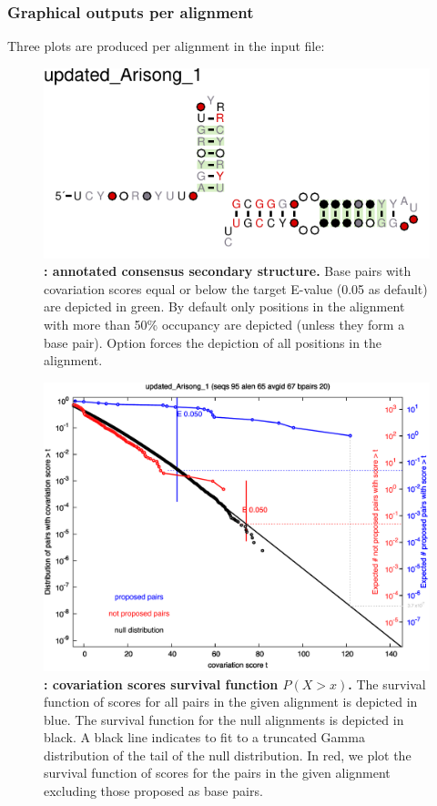 \clearpage
\subsubsection{Graphical outputs per alignment}
 Three plots are produced per alignment in the input file: 

 \begin{figure}[h]
   \includegraphics[scale=1.5]{Arisong_R2R.pdf} 
 \caption{\small\textbf{:
     annotated consensus secondary structure.} Base pairs with
   covariation scores equal or below the target E-value (0.05 as
   default) are depicted in green. By default only positions in the
   alignment with more than 50\% occupancy are depicted (unless they form
   a base pair). Option  forces the depiction of all
   positions in the alignment.  }
 \label{fig:r2r}
 \end{figure}

 \begin{figure}[h] \includegraphics[scale=0.50]{Arisong_surv.pdf} 
 \caption{\small\textbf{:
 covariation scores survival function $P(X>x)$.}  The survival
 function of scores for all pairs in the given alignment is depicted
 in blue. The survival function for the null alignments is depicted in
 black. A black line indicates to fit to a truncated Gamma
 distribution of the tail of the null distribution. In red, we plot
 the survival function of scores for the pairs in the given alignment
 excluding those proposed as base
 pairs.}  \label{fig:surv} \end{figure}

